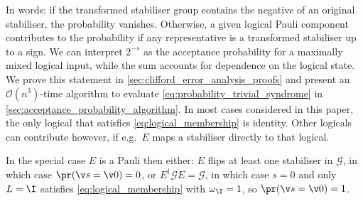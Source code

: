 
\noindent
In words:
if the transformed stabiliser group contains
the negative of an original stabiliser,
the probability vanishes.
Otherwise,
a given logical Pauli component contributes to the probability if
any representative is a transformed stabiliser up to a sign.
We can interpret $2^{-s}$ as the acceptance probability for a maximally
mixed logical input, while the sum accounts for dependence on the
logical state.
We prove this statement in \cref{sec:clifford_error_analysis_proofs}
and present an $\mathcal O(n^3)$-time algorithm
to evaluate \cref{eq:probability_trivial_syndrome}
in \cref{sec:acceptance_probability_algorithm}.
In most cases considered in this paper,
the only logical that satisfies \cref{eq:logical_membership}
is identity.
Other logicals can contribute however,
if e.g.\ $E$ maps a stabiliser directly to that logical.

In the special case $E$ is a Pauli then either:
	$E$ flips at least one stabiliser in $\mathcal G$,
	in which case $\pr(\v s =\v 0) =0$,
	or $E^\dag \mathcal G E =\mathcal G$,
	in which case $s =0$ and only $L =\I$ satisfies
	\cref{eq:logical_membership} with $\omega_\I =1$,
	so $\pr(\v s =\v 0) =1$.

